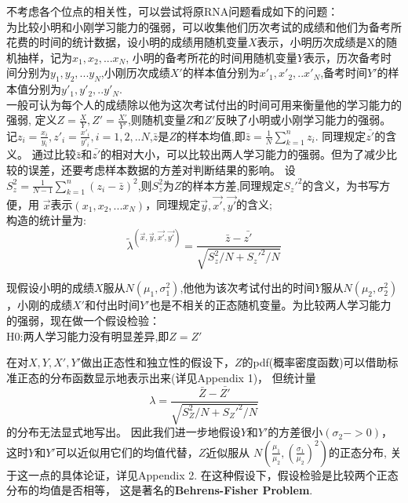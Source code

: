 ﻿\documentclass[12pt]{article}
\begin{document}
\title{\textbf{}} 

\author{}
\maketitle
\large

不考虑各个位点的相关性，可以尝试将原RNA问题看成如下的问题：\\
\indent 为比较小明和小刚学习能力的强弱，可以收集他们历次考试的成绩和他们为备考所花费的时间的统计数据，设小明的成绩用随机变量$X$表示，小明历次成绩是X的随机抽样，记为$x_1,x_2,...x_N$,
小明的备考所花的时间用随机变量$Y$表示，历次备考时间分别为$y_1,y_2,...y_N$,小刚历次成绩$X'$的样本值分别为$x'_1,x'_2,..x'_N$,备考时间$Y'$的样本值分别为$y'_1,y'_2,..y'_N$.\\
\indent 一般可认为每个人的成绩除以他为这次考试付出的时间可用来衡量他的学习能力的强弱,
定义$Z=\frac{X}{Y},Z'=\frac{X'}{Y'}$,则随机变量$Z$和$Z'$反映了小明或小刚学习能力的强弱。
   记$z_i=\frac{x_i}{y_i},z'_i=\frac{x'_i}{y'_i},i=1,2,..N$,$\bar{z}$是$Z$的样本均值,即$\bar{z}=\frac{1}{N}\sum\limits_{k=1}^n z_i$.
   同理规定$\bar{z'}$的含义。
   通过比较$\bar{z}$和$\bar{z'}$的相对大小，可以比较出两人学习能力的强弱。但为了减少比较的误差，还要考虑样本数据的方差对判断结果的影响。
   设$S^2_z=\frac{1}{N-1}\sum\limits_{k=1}^n (z_i-\bar{z})^2$,则$S_z^2$为$Z$的样本方差,同理规定$S_z'^2$的含义，为书写方便，用
   $\vec{x}$表示$(x_1,x_2,...x_N)$，同理规定$\vec{y},\vec{x'},\vec{y'}$的含义;   \\
  \indent
   构造的统计量为:
\begin{equation}
\tilde{\lambda}^(\vec{x},\vec{y},\vec{x'},\vec{y'})=\frac{\bar{z}-\bar{z'}}{\sqrt{S_z^2/N+S_z'^2/N}}
\end{equation}
      
现假设小明的成绩$X$服从$N(\mu_1,\sigma_1^2)$,他他为该次考试付出的时间$Y$服从$N(\mu_2,\sigma_2^2)$，小刚的成绩$X'$和付出时间$Y'$也是不相关的正态随机变量。为比较两人学习能力的强弱，现在做一个假设检验：\\
H0:两人学习能力没有明显差异,即$Z=Z'$

在对$X,Y,X',Y'$做出正态性和独立性的假设下，$Z$的pdf(概率密度函数)可以借助标准正态的分布函数显示地表示出来(详见Appendix 1)，
但统计量
\begin{equation}
\lambda=\frac{\bar{Z}-\bar{Z'}}{\sqrt{S_Z^2/N+S_Z'^2/N}}
\end{equation}
的分布无法显式地写出。
因此我们进一步地假设$Y$和$Y'$的方差很小$(\sigma_2->0)$，这时$Y$和$Y'$可以近似用它们的均值代替，$Z$近似服从
$N(\frac{\mu_1}{\mu_2},(\frac{\sigma_1}{\mu_2})^2)$的正态分布,
关于这一点的具体论证，详见Appendix 2.
在这种假设下，假设检验是比较两个正态分布的均值是否相等，
这是著名的\textbf{Behrens-Fisher Problem}.
\end{document}
